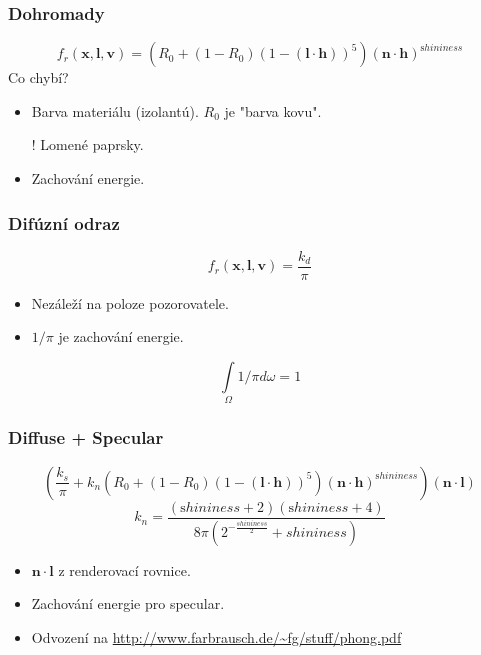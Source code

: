 \begin{frame}
    \frametitle{Dohromady}
    \begin{equation*}
        f_r(\mathbf x, \mathbf l, \mathbf v) = (R_0 + (1-R_0)(1-(\mathbf l \cdot \mathbf h))^5)(\mathbf n \cdot \mathbf h)^{\mathrm shininess}
    \end{equation*}
    Co chybí?
    \begin{itemize}
        \item Barva materiálu (izolantú). $R_0$ je "barva kovu".
        \item[!] Lomené paprsky.
        \item Zachování energie.
    \end{itemize}
\end{frame}

\begin{frame}
    \frametitle{Difúzní odraz}
    \begin{equation*}
        f_r(\mathbf x, \mathbf l, \mathbf v) = \frac{k_d}{\pi}
    \end{equation*}
    \begin{itemize}
        \item Nezáleží na poloze pozorovatele.
        \item $1/\pi$ je zachování energie.
    \end{itemize}
    \begin{equation*}
        \int\limits_\Omega 1/\pi d\omega = 1
    \end{equation*}
\end{frame}

\begin{frame}
    \frametitle{Diffuse + Specular}
    \begin{equation*}
        \left(\frac{k_s}{\pi} + k_n(R_0 + (1-R_0)(1-(\mathbf l \cdot \mathbf h))^5)(\mathbf n \cdot \mathbf h)^{\mathrm shininess}\right)(\mathbf n \cdot \mathbf l)
    \end{equation*}
    \begin{equation*}
        k_n = \frac{(\mathrm shininess + 2)(\mathrm shininess + 4)}{8\pi(2^{-\frac{shininess}{2}} + shininess)}
    \end{equation*}
    \begin{itemize}
        \item $\mathbf n \cdot \mathbf l$ z renderovací rovnice.
        \item Zachování energie pro specular.
        \item Odvození na \url{http://www.farbrausch.de/~fg/stuff/phong.pdf}
    \end{itemize}
\end{frame}

